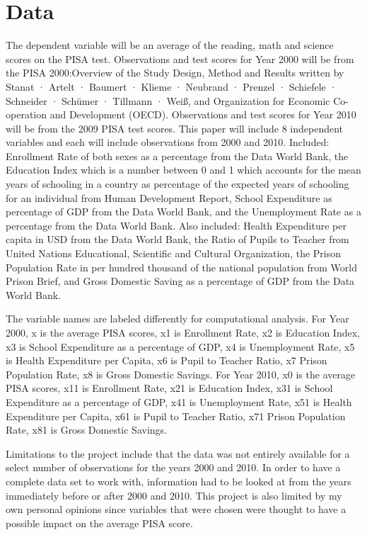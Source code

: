 \documentclass[12pt,english]{article}
\begin{document}
\section{Data}
The dependent variable will be an average of the reading, math and science scores on the PISA test. Observations and test scores for Year 2000 will be from the PISA 2000:Overview of the Study Design, Method and Results written by Stanat · Artelt · Baumert · Klieme · Neubrand · Prenzel · Schiefele · Schneider · Schümer · Tillmann · Weiß, and Organization for Economic Co-operation and Development (OECD). Observations and test scores for Year 2010 will be from the 2009 PISA test scores. This paper will include 8 independent variables and each will include observations from 2000 and 2010. Included: Enrollment Rate of both sexes as a percentage from the Data World Bank, the Education Index which is a number between 0 and 1 which accounts for the mean years of schooling in a country as percentage of the expected years of schooling for an individual from Human Development Report, School Expenditure as percentage of GDP from the Data World Bank, and the Unemployment Rate as a percentage from the Data World Bank. Also included: Health Expenditure per capita in USD from the Data World Bank, the Ratio of Pupils to Teacher from United Nations Educational, Scientific and Cultural Organization, the Prison Population Rate in per hundred thousand of the national population from World Prison Brief, and Gross Domestic Saving as a percentage of GDP from the Data World Bank.

The variable names are labeled differently for computational analysis. For Year 2000, x is the average PISA scores, x1 is Enrollment Rate, x2 is Education Index, x3 is School Expenditure as a percentage of GDP, x4 is Unemployment Rate, x5 is Health Expenditure per Capita, x6 is Pupil to Teacher Ratio, x7 Prison Population Rate, x8 is Gross Domestic Savings. For Year 2010, x0 is the average PISA scores, x11 is Enrollment Rate, x21 is Education Index, x31 is School Expenditure as a percentage of GDP, x41 is Unemployment Rate, x51 is Health Expenditure per Capita, x61 is Pupil to Teacher Ratio, x71 Prison Population Rate, x81 is Gross Domestic Savings. 

Limitations to the project include that the data was not entirely available for a select number of observations for the years 2000 and 2010. In order to have a complete data set to work with, information had to be looked at from the years immediately before or after 2000 and 2010. This project is also limited by my own personal opinions since variables that were chosen were thought to have a possible impact on the average PISA score.
\end{document}
